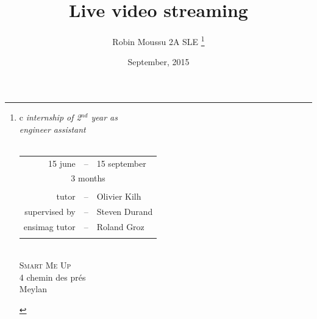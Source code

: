\documentclass[a4paper,11pt]{custom}
\newcommand{\smu}{\textsc{Smart Me Up}\xspace}
\begin{document}



\title{
  Live video streaming
}
\author{
  Robin Moussu 2A SLE
  \thanks{
  \begin{tabular}{c}
    \textit{internship of 2$^{nd}$ year as}\\
    \textit{engineer assistant}\\
    \vspace{2em}\\
    \begin{tabular}{rcl}
      15 june &--& 15 september\\
      \multicolumn{3}{c}{3 months}\\
      \\
      tutor &--& Olivier Kilh \\
      supervised by &--& Steven Durand \\
      ensimag tutor &--& Roland Groz\\
      \\
    \end{tabular}
    \vspace{2em}\\
    \smu\\
    4 chemin des prés\\
    Meylan\\
  \end{tabular}
  }
}
\date{
  September, 2015
}
\maketitle

\end{document}
